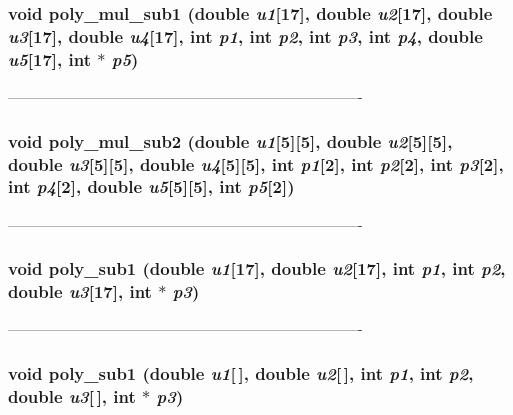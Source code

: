 \subsubsection{\setlength{\rightskip}{0pt plus 5cm}void poly\_\-mul\_\-sub1 (double {\em u1}[17], double {\em u2}[17], double {\em u3}[17], double {\em u4}[17], int {\em p1}, int {\em p2}, int {\em p3}, int {\em p4}, double {\em u5}[17], int $\ast$ {\em p5})}\label{PTripepClosure_8h_63ea6c502267c97b1a85bde5d72af6e2}


---------------------------------------------------------------------------- 

\subsubsection{\setlength{\rightskip}{0pt plus 5cm}void poly\_\-mul\_\-sub2 (double {\em u1}[5][5], double {\em u2}[5][5], double {\em u3}[5][5], double {\em u4}[5][5], int {\em p1}[2], int {\em p2}[2], int {\em p3}[2], int {\em p4}[2], double {\em u5}[5][5], int {\em p5}[2])}\label{PTripepClosure_8h_f02e483f50044be8a8ac76ba41591d38}


---------------------------------------------------------------------------- 

\subsubsection{\setlength{\rightskip}{0pt plus 5cm}void poly\_\-sub1 (double {\em u1}[17], double {\em u2}[17], int {\em p1}, int {\em p2}, double {\em u3}[17], int $\ast$ {\em p3})}\label{PTripepClosure_8h_fd398c73590674838f63fa3ae71ef713}


---------------------------------------------------------------------------- 

\subsubsection{\setlength{\rightskip}{0pt plus 5cm}void poly\_\-sub1 (double {\em u1}[$\,$], double {\em u2}[$\,$], int {\em p1}, int {\em p2}, double {\em u3}[$\,$], int $\ast$ {\em p3})}\label{PTripepClosure_8h_6924e4c0f28687ed25104959fb15463f}


